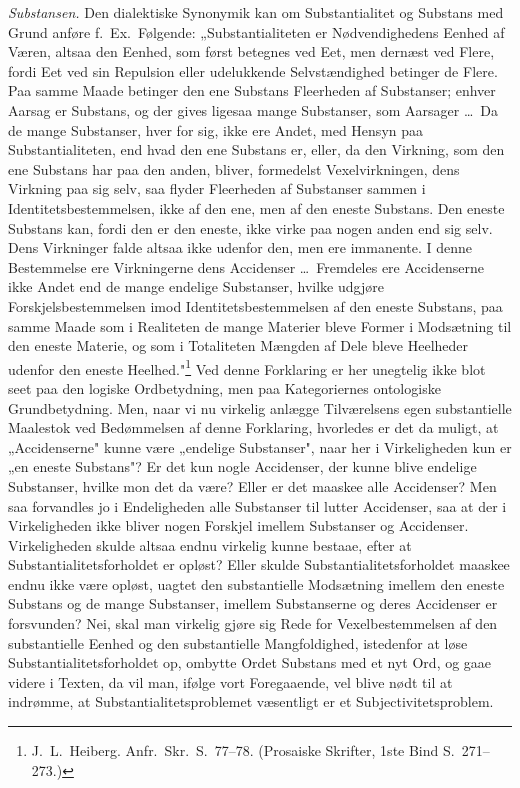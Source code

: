 \documentclass[12pt]{book}
\newcommand{\opage}[1]{\marginnote{\footnotesize\textit{[#1]}}}
\begin{document}
\emph{Substansen.} Den dialektiske Synonymik kan om Substantialitet og Substans med Grund
anføre f.\ Ex.\ Følgende: „Substantialiteten er Nødvendighedens Eenhed af Væren, altsaa
den Eenhed, som først betegnes ved Eet, men dernæst ved Flere, fordi Eet ved sin Repulsion
eller udelukkende Selvstændighed betinger de Flere. Paa samme Maade betinger den ene
Substans Fleerheden af Substanser; enhver Aarsag er Substans, og der gives ligesaa mange
Substanser, som Aarsager \dots\ Da de mange Substanser, hver for sig, ikke ere Andet, med
Hensyn paa Substantialiteten, end hvad den ene Substans er, eller, da den Virkning, som
den ene Substans har paa den anden, bliver, formedelst Vexelvirkningen, dens Virkning paa
sig selv, saa flyder Fleerheden af Substanser sammen i Identitetsbestemmelsen, ikke af den
ene, men af den eneste Substans. Den eneste Substans kan, fordi den er den eneste, ikke
virke paa nogen anden end sig selv. Dens Virkninger falde altsaa ikke udenfor den, men ere
immanente. I denne Bestemmelse ere Virkningerne dens Accidenser \dots\ Fremdeles ere
Accidenserne ikke Andet end de mange endelige Substanser, hvilke udgjøre
Forskjelsbestemmelsen imod Identitetsbestemmelsen af den eneste Substans, paa samme Maade
som i Realiteten de mange Materier bleve Former i Modsætning til den eneste Materie, og som
i Totaliteten Mængden af Dele bleve Heelheder udenfor den eneste
Heelhed."\footnote{J.\ L.\ Heiberg. Anfr.\ Skr.\ S.~77--78. (Prosaiske Skrifter, 1ste
Bind S.~271--273.)} Ved denne Forklaring er her unegtelig ikke blot seet paa den logiske
Ordbetydning, men paa Kategoriernes ontologiske Grundbetydning. Men, naar vi nu virkelig
anlægge Tilværelsens egen substantielle Maalestok ved Bedømmelsen af denne Forklaring,
\opage{137} hvorledes er det da muligt, at „Accidenserne" kunne være „endelige Substanser", naar her i
Virkeligheden kun er „en eneste Substans"? Er det kun nogle Accidenser, der kunne blive
endelige Substanser, hvilke mon det da være? Eller er det maaskee alle Accidenser? Men saa
forvandles jo i Endeligheden alle Substanser til lutter Accidenser, saa at der i
Virkeligheden ikke bliver nogen Forskjel imellem Substanser og Accidenser. Virkeligheden
skulde altsaa endnu virkelig kunne bestaae, efter at Substantialitetsforholdet er opløst?
Eller skulde Substantialitetsforholdet maaskee endnu ikke være opløst, uagtet den
substantielle Modsætning imellem den eneste Substans og de mange Substanser, imellem
Substanserne og deres Accidenser er forsvunden? Nei, skal man virkelig gjøre sig Rede for
Vexelbestemmelsen af den substantielle Eenhed og den substantielle Mangfoldighed,
istedenfor at løse Substantialitetsforholdet op, ombytte Ordet Substans med et nyt Ord, og
gaae videre i Texten, da vil man, ifølge vort Foregaaende, vel blive nødt til at indrømme,
at Substantialitetsproblemet væsentligt er et Subjectivitetsproblem.
\end{document}
